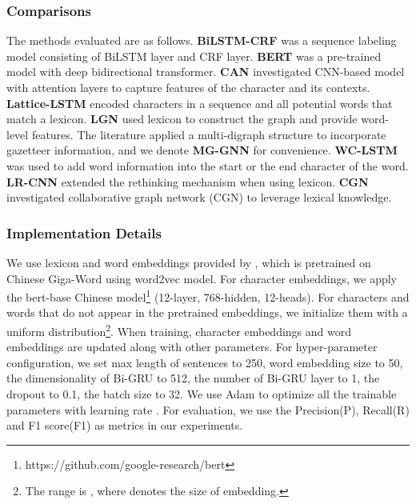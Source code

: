 \documentclass[conference]{IEEEtran}
\begin{document}
    
\subsubsection{Comparisons} 
The methods evaluated are as follows.
\textbf{BiLSTM-CRF} \cite{huang2015bidirectional}  was a sequence labeling model consisting of BiLSTM layer and CRF layer.
\textbf{BERT} \cite{devlin-etal-2019-bert} was a pre-trained model with deep bidirectional transformer.
    \textbf{CAN} \cite{zhu2019can} investigated CNN-based model with attention layers to capture features of the character and its contexts.
\textbf{Lattice-LSTM} \cite{zhang2018chinese} encoded characters in a sequence and all potential words that match a lexicon.
\textbf{LGN} \cite{gui2019lexicon} used lexicon to construct the graph and provide word-level features.
The literature \cite{ding2019neural} applied a multi-digraph structure to incorporate gazetteer information, and we denote \textbf{MG-GNN} for convenience. 
\textbf{WC-LSTM} \cite{liu2019encoding} was used to add word information into the start or the end character of the word. 
\textbf{LR-CNN} \cite{gui2019cnn}  extended the rethinking mechanism when using lexicon.
\textbf{CGN} \cite{sui2019leverage} investigated collaborative graph network (CGN) to leverage lexical knowledge.


        
\subsubsection{Implementation Details}
We use lexicon and word embeddings provided by \cite{li-etal-2018-analogical},
which is pretrained on Chinese Giga-Word 
using word2vec model. 
For character embeddings, we apply the {bert{-}base Chinese} model\footnote{https://github.com/google-research/bert} 
(12-layer, 768-hidden, 12-heads). 
For characters and words that do not appear in the pretrained embeddings, we initialize them with a uniform distribution\footnote{The range is , where  denotes
the size of embedding.}.
When training, character embeddings and word embeddings are updated along with other parameters.
For hyper-parameter configuration, 
we set max length of sentences to 250, word embedding size to 50, 
the dimensionality of Bi-GRU to 512, the number of Bi-GRU layer to 1, 
the dropout to 0.1,
the batch size to 32.
We use Adam to optimize all the trainable parameters with learning rate . For evaluation,  we use the Precision(P), Recall(R) and F1 score(F1) as metrics in our experiments.
\end{document}
